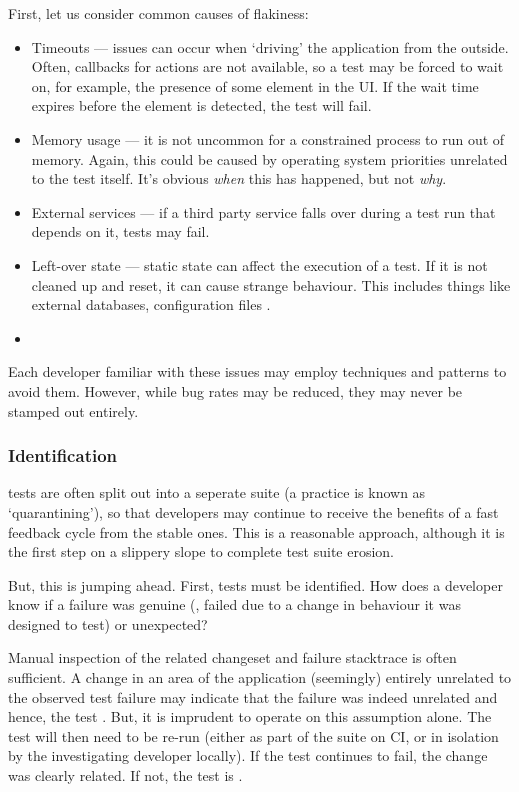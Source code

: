 First, let us consider common causes of flakiness:
\begin{itemize}
	\item Timeouts --- issues can occur when {\lq}driving{\rq} the application
	from the outside. Often, callbacks for actions are not available, so a test
	may be forced to wait on, for example, the presence of some element in the UI.
	If the wait time expires before the element is detected, the test will fail.
	\item Memory usage --- it is not uncommon for a constrained process to run out
	of memory. Again, this could be caused by operating system priorities
	unrelated to the test itself. It's obvious \textit{when} this has happened,
	but not \textit{why}.
	\item External services --- if a third party service falls over during a test
	run that depends on it, tests may fail.
	\item Left-over state --- static state can affect the execution of a test. If
	it is not cleaned up and reset, it can cause strange behaviour. This includes
	things like external databases, configuration files \etc.
	\item {}
\end{itemize}

Each developer familiar with these issues may employ techniques and patterns to
avoid them. However, while bug rates may be reduced, they may never be stamped
out entirely.

\subsubsection{Identification}

\Flaky tests are often split out into a seperate suite (a practice is known as
{\lq}quarantining{\rq}), so that developers may continue to receive the benefits
of a fast feedback cycle from the stable ones. This is a reasonable approach,
although it is the first step on a slippery slope to complete test suite
erosion.

But, this is jumping ahead. First, \flaky tests must be identified. How does a
developer know if a failure was genuine (\ie, failed due to a change in
behaviour it was designed to test) or unexpected?

Manual inspection of the related changeset and failure stacktrace is often
sufficient. A change in an area of the application (seemingly) entirely
unrelated to the observed test failure may indicate that the failure was indeed
unrelated and hence, the test \flaky. But, it is imprudent to operate on this
assumption alone. The test will then need to be re-run (either as part of the
suite on CI, or in isolation by the investigating developer locally). If the
test continues to fail, the change was clearly related. If not, the test is
\flaky.

